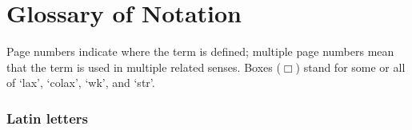 
\chapter{Glossary of Notation}



\noindent
Page numbers indicate where the term is defined; multiple page numbers
mean that the term is used in multiple related senses.  Boxes ($\Box$)
stand for some or all of `lax', `colax', `wk', and `str'.  


\subsection*{Latin letters}



